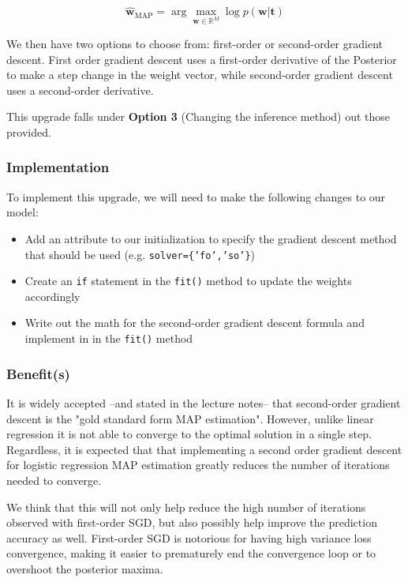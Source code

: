 \documentclass[12pt]{article}
\begin{document}
\begin{equation}
\hat{\textbf{w}}_{\mathrm{MAP}} = \arg\max_{\textbf{w} \in \mathbb{R}^M} \log p(\textbf{w}|\textbf{t}) 
\end{equation} 

We then have two options to choose from: first-order or second-order gradient descent. First order gradient descent uses a first-order derivative of the Posterior to make a step change in the weight vector, while second-order gradient descent uses a second-order derivative.

This upgrade falls under \textbf{Option 3} (Changing the inference method) out those provided.

\subsubsection{Implementation}

To implement this upgrade, we will need to make the following changes to our model:

\begin{itemize}
\item Add an attribute to our initialization to specify the gradient descent method that should be used (e.g. \texttt{solver=\{'fo','so'\}})
\item Create an \texttt{if} statement in the \texttt{fit()} method to update the weights accordingly
\item Write out the math for the second-order gradient descent formula and implement in in the \texttt{fit()} method
\end{itemize}


\subsubsection{Benefit(s)}

It is widely accepted –and stated in the lecture notes– that second-order gradient descent is the "gold standard form MAP estimation". However, unlike linear regression it is not able to converge to the optimal solution in a single step. Regardless, it is expected that that implementing a second order gradient descent for logistic regression MAP estimation greatly reduces the number of iterations needed to converge.

We think that this will not only help reduce the high number of iterations observed with first-order SGD, but also possibly help improve the prediction accuracy as well. First-order SGD is notorious for having high variance loss convergence, making it easier to prematurely end the convergence loop or to overshoot the posterior maxima.
\end{document}
